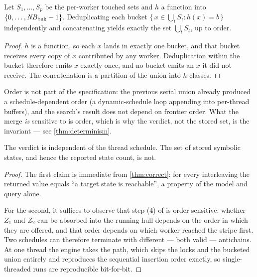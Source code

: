 \begin{lemma}\label{lem:bucket}
Let $S_1,\dots,S_p$ be the per-worker touched sets and $h$ a function into
$\{0,\dots,\mathit{NB}_{\mathrm{buk}}-1\}$.  Deduplicating each bucket
$\{\, x \in \bigcup_t S_t : h(x) = b \,\}$ independently and concatenating
yields exactly the set $\bigcup_t S_t$, up to order.
\end{lemma}

\begin{proof}
$h$ is a function, so each $x$ lands in exactly one bucket, and that bucket
receives every copy of $x$ contributed by any worker.  Deduplication within the
bucket therefore emits $x$ exactly once, and no bucket emits an $x$ it did not
receive.  The concatenation is a partition of the union into $h$-classes.
\end{proof}

\begin{remark}
Order is not part of the specification: the previous serial union already
produced a schedule-dependent order (a dynamic-schedule loop appending into
per-thread buffers), and the search's result does not depend on frontier order.
What the merge \emph{is} sensitive to is order, which is why the verdict, not
the stored set, is the invariant --- see \cref{thm:determinism}.
\end{remark}

\begin{theorem}
\label{thm:determinism}
The verdict is independent of the thread schedule.  The set of stored symbolic
states, and hence the reported state count, is not.
\end{theorem}

\begin{proof}
The first claim is immediate from \cref{thm:correct}: for every interleaving the
returned value equals ``a target state is reachable'', a property of the model
and query alone.

For the second, it suffices to observe that step (4) of  is
order-sensitive: whether $Z_1$ and $Z_2$ can be absorbed into the running hull
depends on the order in which they are offered, and that order depends on which
worker reached the stripe first.  Two schedules can therefore terminate with
different --- both valid --- antichains.  At one thread the engine takes the
 path, which skips the locks and the bucketed union entirely and
reproduces the sequential insertion order exactly, so single-threaded runs are
reproducible bit-for-bit.
\end{proof}

